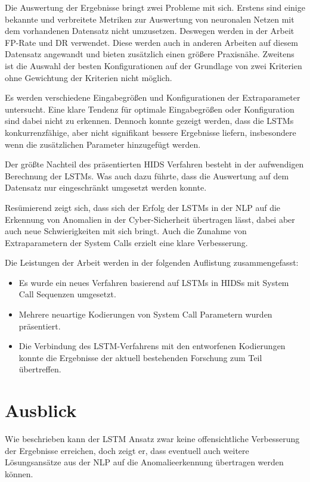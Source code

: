 Die Auswertung der Ergebnisse bringt zwei Probleme mit sich.
Erstens sind einige bekannte und verbreitete Metriken zur Auswertung von neuronalen Netzen mit dem vorhandenen Datensatz nicht umzusetzen.
Deswegen werden in der Arbeit \ac{FP}-Rate und \ac{DR} verwendet. 
Diese werden auch in anderen Arbeiten auf diesem Datensatz angewandt und bieten zusätzlich einen größere Praxisnähe.
Zweitens ist die Auswahl der besten Konfigurationen auf der Grundlage von zwei Kriterien ohne Gewichtung der Kriterien nicht möglich.\par\medskip

Es werden verschiedene Eingabegrößen und Konfigurationen der Extraparameter untersucht.
Eine klare Tendenz für optimale Eingabegrößen oder Konfiguration sind dabei nicht zu erkennen.
Dennoch konnte gezeigt werden, dass die \acp{LSTM} konkurrenzfähige, aber nicht signifikant bessere Ergebnisse liefern, insbesondere wenn die zusätzlichen Parameter hinzugefügt werden.\par\medskip

Der größte Nachteil des präsentierten \ac{HIDS} Verfahren besteht in der aufwendigen Berechnung der \acp{LSTM}.
Was auch dazu führte, dass die Auswertung auf dem Datensatz nur eingeschränkt umgesetzt werden konnte.\par\medskip

Resümierend zeigt sich, dass sich der Erfolg der \acp{LSTM} in der \ac{NLP} auf die Erkennung von Anomalien in der Cyber-Sicherheit übertragen lässt, dabei aber auch neue Schwierigkeiten mit sich bringt.
Auch die Zunahme von Extraparametern der System Calls erzielt eine klare Verbesserung.\par\medskip

Die Leistungen der Arbeit werden in der folgenden Auflistung zusammengefasst:
\begin{itemize}
    \item Es wurde ein neues Verfahren basierend auf \acp{LSTM} in \acp{HIDS} mit System Call Sequenzen umgesetzt.
    \item Mehrere neuartige Kodierungen von System Call Parametern wurden präsentiert. 
    \item Die Verbindung des \ac{LSTM}-Verfahrens mit den entworfenen Kodierungen konnte die Ergebnisse der aktuell bestehenden Forschung zum Teil übertreffen.
\end{itemize}

\section{Ausblick}
Wie beschrieben kann der \ac{LSTM} Ansatz zwar keine offensichtliche Verbesserung der Ergebnisse erreichen, doch zeigt er, dass eventuell auch weitere Lösungsansätze aus der \ac{NLP} auf die Anomalieerkennung übertragen werden können.\par\medskip

